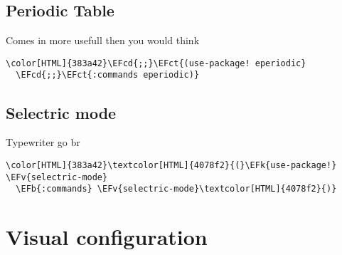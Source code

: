 \documentclass{scrartcl}
\newcommand{\EFk}[1]{\textcolor{EFk}{#1}} %
\newcommand{\EFb}[1]{\textcolor{EFb}{#1}} %
\newcommand{\EFct}[1]{\textcolor{EFct}{#1}} %
\newcommand{\EFv}[1]{\textcolor{EFv}{#1}} %
\newcommand{\EFcd}[1]{\textcolor{EFcd}{#1}} %
\begin{document}
\subsection{Periodic Table}
\label{sec:orgdea8d91}
Comes in more usefull then you would think
\begin{Code}
\begin{Verbatim}[]
\color[HTML]{383a42}\EFcd{;;}\EFct{(use-package! eperiodic}
  \EFcd{;;}\EFct{:commands eperiodic)}
\end{Verbatim}
\end{Code}

\subsection{Selectric mode}
\label{sec:orgb83fab7}
Typewriter go br
\begin{Code}
\begin{Verbatim}[]
\color[HTML]{383a42}\textcolor[HTML]{4078f2}{(}\EFk{use-package!} \EFv{selectric-mode}
  \EFb{:commands} \EFv{selectric-mode}\textcolor[HTML]{4078f2}{)}
\end{Verbatim}
\end{Code}

\section{Visual configuration}
\label{sec:orgeefa70a}
\end{document}
